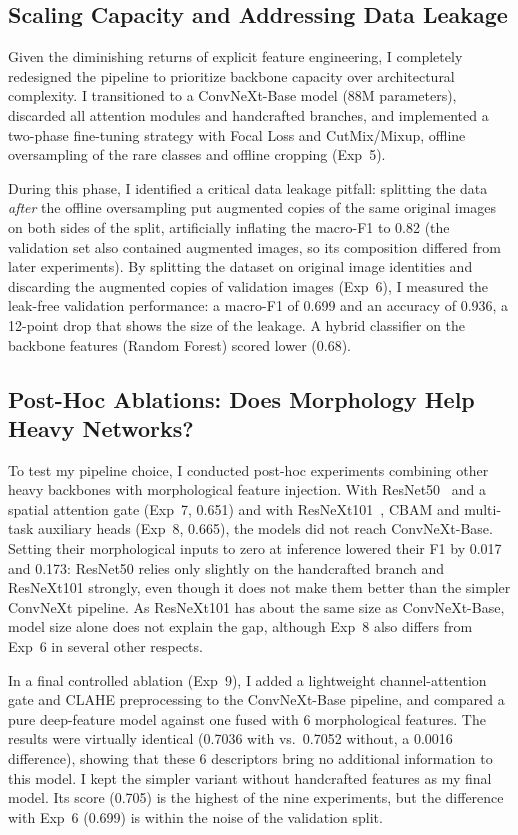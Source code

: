 \documentclass[twocolumn,a4paper]{article}
\begin{document}
\subsection{Scaling Capacity and Addressing Data Leakage}
\label{sec:leakage}

Given the diminishing returns of explicit feature engineering, I completely redesigned the pipeline to prioritize backbone capacity over architectural complexity. I transitioned to a ConvNeXt-Base model (88M parameters), discarded all attention modules and handcrafted branches, and implemented a two-phase fine-tuning strategy with Focal Loss and CutMix/Mixup, offline oversampling of the rare classes and offline cropping (Exp~5).

During this phase, I identified a critical data leakage pitfall: splitting the data \emph{after} the offline oversampling put augmented copies of the same original images on both sides of the split, artificially inflating the macro-F1 to 0.82 (the validation set also contained augmented images, so its composition differed from later experiments). By splitting the dataset on original image identities and discarding the augmented copies of validation images (Exp~6), I measured the leak-free validation performance: a macro-F1 of 0.699 and an accuracy of 0.936, a 12-point drop that shows the size of the leakage. A hybrid classifier on the backbone features (Random Forest) scored lower (0.68).

\subsection{Post-Hoc Ablations: Does Morphology Help Heavy Networks?}
\label{sec:ablations}

To test my pipeline choice, I conducted post-hoc experiments combining other heavy backbones with morphological feature injection. With ResNet50~\cite{he2016deep} and a spatial attention gate (Exp~7, 0.651) and with ResNeXt101~\cite{xie2017aggregated}, CBAM and multi-task auxiliary heads (Exp~8, 0.665), the models did not reach ConvNeXt-Base. Setting their morphological inputs to zero at inference lowered their F1 by 0.017 and 0.173: ResNet50 relies only slightly on the handcrafted branch and ResNeXt101 strongly, even though it does not make them better than the simpler ConvNeXt pipeline. As ResNeXt101 has about the same size as ConvNeXt-Base, model size alone does not explain the gap, although Exp~8 also differs from Exp~6 in several other respects.

In a final controlled ablation (Exp~9), I added a lightweight channel-attention gate and CLAHE preprocessing to the ConvNeXt-Base pipeline, and compared a pure deep-feature model against one fused with 6 morphological features. The results were virtually identical (0.7036 with vs.\ 0.7052 without, a 0.0016 difference), showing that these 6 descriptors bring no additional information to this model. I kept the simpler variant without handcrafted features as my final model. Its score (0.705) is the highest of the nine experiments, but the difference with Exp~6 (0.699) is within the noise of the validation split.
\end{document}
